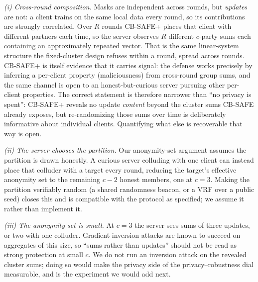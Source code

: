 \documentclass[lettersize,journal]{IEEEtran}
\begin{document}
\emph{(i) Cross-round composition.} Masks are independent across rounds, but
\emph{updates} are not: a client trains on the same local data every round, so its
contributions are strongly correlated. Over $R$ rounds CB-SAFE+ places that client
with different partners each time, so the server observes $R$ different $c$-party sums
each containing an approximately repeated vector. That is the same linear-system
structure the fixed-cluster design refuses within a round, spread across rounds.
CB-SAFE+ is itself evidence that it carries signal: the defense works precisely by
inferring a per-client property (maliciousness) from cross-round group sums, and the
same channel is open to an honest-but-curious server pursuing other per-client
properties. The correct statement is therefore narrower than ``no privacy is spent'':
CB-SAFE+ reveals no update \emph{content} beyond the cluster sums CB-SAFE already
exposes, but re-randomizing those sums over time is deliberately informative about
individual clients. Quantifying what else is recoverable that way is open.

\emph{(ii) The server chooses the partition.} Our anonymity-set argument assumes the
partition is drawn honestly. A curious server colluding with one client can instead
place that colluder with a target every round, reducing the target's effective
anonymity set to the remaining $c-2$ honest members, one at $c{=}3$. Making the
partition verifiably random (a shared randomness beacon, or a VRF over a public seed)
closes this and is compatible with the protocol as specified; we assume it rather
than implement it.

\emph{(iii) The anonymity set is small.} At $c{=}3$ the server sees sums of three
updates, or two with one colluder. Gradient-inversion attacks \cite{zhu2019} are known
to succeed on aggregates of this size, so ``sums rather than updates'' should not be
read as strong protection at small $c$. We do not run an inversion attack on the
revealed cluster sums; doing so would make the privacy side of the
privacy--robustness dial measurable, and is the experiment we would add next.
\end{document}
